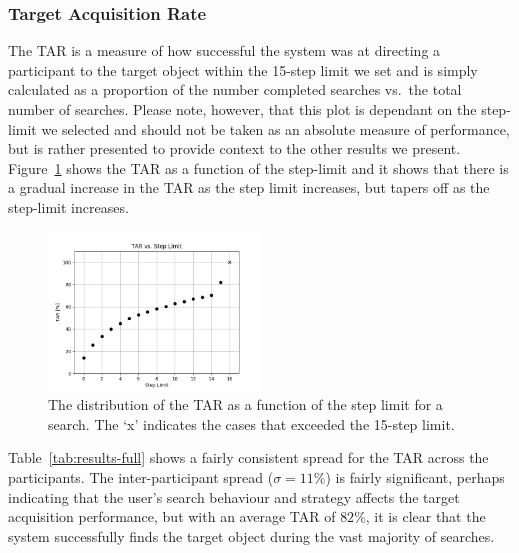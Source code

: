 \documentclass[a4paper, twoside]{article}
\begin{document}
\subsubsection{Target Acquisition Rate}

\noindent The TAR is a measure of how successful the system was at directing a participant to the target object within the 15-step limit we set and is simply calculated as a proportion of the number completed searches vs.\ the total number of searches. Please note, however, that this plot is dependant on the step-limit we selected and should not be taken as an absolute measure of performance, but is rather presented to provide context to the other results we present. Figure~\ref{fig:tar-steps} shows the TAR as a function of the step-limit and it shows that there is a gradual increase in the TAR as the step limit increases, but tapers off as the step-limit increases.

\begin{figure}
  \centering
  \includegraphics[width=0.5\textwidth]{figures/cdf_tar_limit.png}
  \caption{The distribution of the TAR as a function of the step limit for a search. The `x' indicates the cases that exceeded the 15-step limit. }\label{fig:tar-steps}
\end{figure}


Table~\ref{tab:results-full} shows a fairly consistent spread for the TAR across the participants. The inter-participant spread ($\sigma=11\%$) is fairly significant, perhaps indicating that the user's search behaviour and strategy affects the target acquisition performance, but with an average TAR of $82\%$, it is clear that the system successfully finds the target object during the vast majority of searches. 
\end{document}
